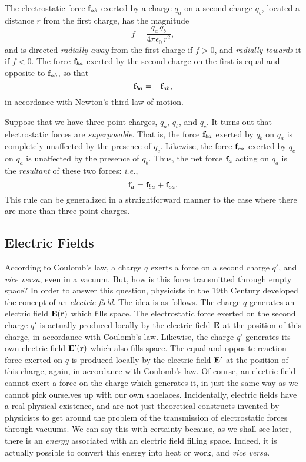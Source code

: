 The electrostatic force ${\bf f}_{ab}$
exerted by a charge $q_a$ on a second charge $q_b$, located
a distance $r$ from the first charge, has the  magnitude 
\begin{equation}
f = \frac{q_a\,q_b}{4\pi\epsilon_0\,r^2}, 
\end{equation}
and is directed {\em radially away}\/ from the first charge if $f>0$, and {\em radially
towards}\/ it if $f<0$. The force 
${\bf f}_{ba}$ exerted by the second charge
on the first is equal and opposite to ${\bf f}_{ab}$, 
so that
\begin{equation}
{\bf f}_{ba} = - {\bf f}_{ab},
\end{equation}
in accordance with Newton's
third law of motion. 

Suppose that we have three point charges, $q_a$, $q_b$, and $q_c$. 
It turns out that electrostatic
forces are {\em superposable}. That is, the force ${\bf f}_{ba}$ exerted by 
$q_b$ on $q_a$ is completely unaffected by the presence of $q_c$. Likewise, the
force ${\bf f}_{ca}$ exerted by $q_c$ on $q_a$ is unaffected by the presence of $q_b$. 
Thus, the net force ${\bf f}_a$ acting on $q_a$ is the {\em resultant} of these two
forces: {\em i.e.},
\begin{equation}
{\bf f}_a = {\bf f}_{ba} + {\bf f}_{ca}.
\end{equation}
This rule can be generalized in a straightforward manner
to the case where there are more than three point
charges. 

\subsection{Electric Fields}
According to Coulomb's law, a charge $q$ exerts a force on a second charge $q'$,
and {\em vice versa}, even in a vacuum. But, how is this force
transmitted through empty space? In order to answer this question, physicists in the
19th Century 
developed the concept of an {\em electric field}. The idea is as follows. The
charge $q$ generates an electric field ${\bf E}({\bf r})$ which fills space.
The electrostatic force exerted on the second charge $q'$ is actually produced locally by the 
electric field ${\bf E}$ at the position of this charge, in accordance with Coulomb's law. Likewise, the charge $q'$ generates its
own electric field ${\bf E}'({\bf r})$ which also fills space. The equal and opposite reaction
force exerted on $q$ is  produced locally by the electric field ${\bf E}'$ at the
position of this charge, again, in accordance with Coulomb's law. Of course, an electric field
cannot exert a force on the charge which   generates it,
 in just the same way as we cannot pick ourselves  up with our own shoelaces. Incidentally, electric fields have a real physical existence, and are not just theoretical constructs invented by physicists to get around the
problem of the transmission of electrostatic
forces through vacuums. 
We can say this with certainty  because, as we shall see later, there is an {\em energy}\/
associated with
an electric field filling space. Indeed, it is actually possible to convert this energy into
heat or work, and {\em vice versa}. 

